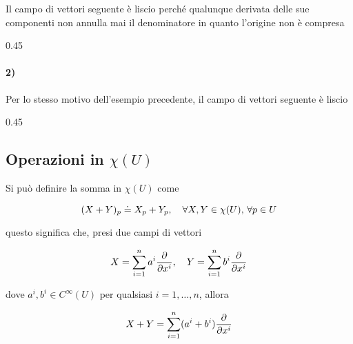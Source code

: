 Il campo di vettori seguente è liscio perché qualunque derivata delle sue componenti non annulla mai il denominatore in quanto l'origine non è compresa

	{0.45}{%
		}

\paragraph{2)}

Per lo stesso motivo dell'esempio precedente, il campo di vettori seguente è liscio

	{0.45}{%
	}

\subsection{Operazioni in $ \chi(U) $}

Si può definire la somma in $ \chi(U) $ come

\begin{equation}
	(X+Y)_{p} \doteq X_{p} + Y_{p} \qcomma \forall X,Y \in \chi(U), \, \forall p \in U
\end{equation}

questo significa che, presi due campi di vettori

\begin{equation}
	X = \sum_{i=1}^{n} a^{i} \pdv{x^{i}} \qcomma Y = \sum_{i=1}^{n} b^{i} \pdv{x^{i}}
\end{equation}

dove $ a^{i},b^{i} \in C^{\infty}(U) $ per qualsiasi $ i = 1, \dots, n $, allora

\begin{equation}
	X + Y = \sum_{i=1}^{n} (a^{i}+b^{i}) \pdv{x^{i}}
\end{equation}

